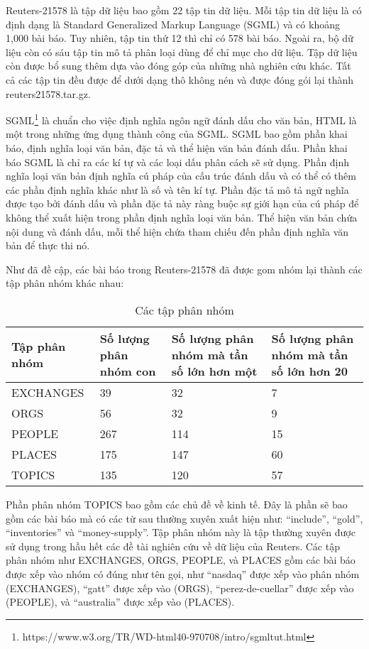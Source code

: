 Reuters-21578 là tập dữ liệu bao gồm 22 tập tin dữ liệu.
Mỗi tập tin dữ liệu là có định dạng là Standard Generalized Markup Language (SGML) và có khoảng 1,000 bài báo.
Tuy nhiên, tập tin thứ 12 thì chỉ có 578 bài báo.
Ngoài ra, bộ dữ liệu còn có sáu tập tin mô tả phân loại dùng để chỉ mục cho dữ liệu.
Tập dữ liệu còn được bổ sung thêm dựa vào đóng góp của những nhà nghiên cứu khác.
Tất cả các tập tin đều được để dưới dạng thô không nén và được đóng gói lại thành reuters21578.tar.gz.

SGML\footnote{https://www.w3.org/TR/WD-html40-970708/intro/sgmltut.html} là chuẩn cho việc định nghĩa ngôn ngữ đánh dấu cho văn bản, HTML là một trong những ứng dụng thành công của SGML.
SGML bao gồm phần khai báo, định nghĩa loại văn bản, đặc tả và thể hiện văn bản đánh dấu.
Phần khai báo SGML là chỉ ra các kí tự và các loại dấu phân cách sẽ sử dụng.
Phần định nghĩa loại văn bản định nghĩa cú pháp của cấu trúc đánh dấu và có thể có thêm các phần định nghĩa khác như là số và tên kí tự.
Phần đặc tả mô tả ngữ nghĩa được tạo bởi đánh dấu và phần đặc tả này ràng buộc sự giới hạn của cú pháp để không thể xuất hiện trong phần định nghĩa loại văn bản.
Thể hiện văn bản chứa nội dung và đánh dấu, mỗi thể hiện chứa tham chiếu đến phần định nghĩa văn bản để thực thi nó.

Như đã đề cập, các bài báo trong Reuters-21578 đã được gom nhóm lại thành các tập phân nhóm khác nhau:
\begin{table}[ht]
\begin{center}
\begin{tabularx}{\textwidth}{|Y|Y|Y|Y|}
\hline
Tập phân nhóm & Số lượng phân nhóm con & Số lượng phân nhóm mà tần số lớn hơn một & Số lượng phân nhóm mà tần số lớn hơn 20  \\
\hline
EXCHANGES & 39 & 32 & 7\\
\hline
ORGS & 56 & 32 & 9\\
\hline
PEOPLE & 267 & 114 & 15 \\
\hline
PLACES & 175 & 147 & 60\\
\hline
TOPICS & 135 & 120 & 57\\
\hline
\end{tabularx}
\caption[Các tập phân nhóm]{Các tập phân nhóm}
\label{bang_4_2}
\end{center}
\end{table}

Phần phân nhóm TOPICS bao gồm các chủ đề về kinh tế.
Đây là phần sẽ bao gồm các bài báo mà có các từ sau thường xuyên xuất hiện như: ``include'', ``gold'', ``inventories'' và ``money-supply''.
Tập phân nhóm này là tập thường xuyên được sử dụng trong hầu hết các đề tài nghiên cứu về dữ liệu của Reuters.
Các tập phân nhóm như EXCHANGES, ORGS, PEOPLE, và PLACES gồm các bài báo được xếp vào nhóm có đúng như tên gọi, như ``nasdaq'' được xếp vào phân nhóm (EXCHANGES), ``gatt'' được xếp vào (ORGS), ``perez-de-cuellar'' được xếp vào (PEOPLE), và ``australia'' được xếp vào (PLACES).

